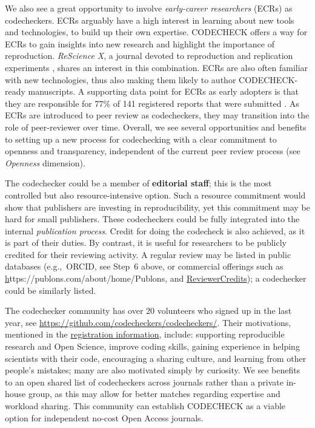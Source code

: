 \documentclass[12pt]{article}
\newcommand{\rev}[1]{\textit{#1}}
\begin{document}
We also see a great opportunity to involve \emph{early-career
  researchers} (ECRs) as codecheckers.  ECRs arguably have a high
interest in learning about new tools and technologies, to build up
their own expertise.  CODECHECK offers a way for ECRs to gain insights
into new research and highlight the importance of reproduction.
\emph{ReScience X}, a journal devoted to reproduction and replication
experiments \cite{roesch_new_2020}, shares an interest in this
combination.  ECRs are also often familiar with new technologies, thus
also making them likely to author CODECHECK-ready manuscripts.  A
supporting data point for ECRs as early adopters is that they are
responsible for 77\% of 141 registered reports that were submitted
\cite{chambers_registered_2019}.  As ECRs are introduced to peer
review as codecheckers, they may transition into the role of
peer-reviewer over time.  Overall, we see several opportunities
and benefits to setting up a new process for codechecking with a clear
commitment to openness and transparency, independent of the current
peer review process (see \emph{Openness} dimension).

The codechecker could be a member of \textbf{editorial staff}; this is
the most controlled but also resource-intensive option.  Such a
resource commitment would show that publishers are investing in
reproducibility, yet this commitment may be hard for small publishers.
These codecheckers could be fully integrated into the internal \rev{publication process}.
Credit for doing the codecheck is also achieved, as it is part of
their duties.  By contrast, it is useful for researchers to be
publicly credited for their reviewing activity.  A regular review
may be listed in public databases (e.g.,~ORCID, see Step~6 above,
or commercial offerings such as \href{}https://publons.com/about/home/{Publons}, and
\href{https://www.reviewercredits.com/}{ReviewerCredits});
a codechecker could be similarly listed.

The codechecker community has over 20 volunteers who signed up in the last
year, see \url{https://github.com/codecheckers/codecheckers/}.  Their
motivations, mentioned in the \href{https://github.com/codecheckers/codecheckers/labels/registration}{registration
information},
include: supporting reproducible research and Open Science, improve
coding skills, gaining experience in helping scientists with their
code, encouraging a sharing culture, and learning from other people's
mistakes; many are also motivated simply by curiosity.  We see
benefits to an open shared list of codecheckers across journals rather
than a private in-house group, as this may allow for better matches
regarding expertise and workload sharing.  
This community can establish CODECHECK as a viable option
for independent no-cost Open Access journals.
\end{document}
